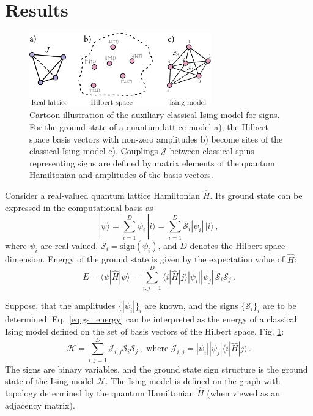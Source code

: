\section{Results}\label{sec:Ising}

\begin{figure}[t!]
    \centering
    \includegraphics[width=0.7\textwidth]{handmade/cartoon_ising.pdf}
	\caption{\label{fig:sign_ising}Cartoon illustration of the auxiliary classical Ising model for signs. For the ground state of a quantum lattice model a), the Hilbert space basis vectors with non-zero amplitudes b) become sites of the classical Ising model c). Couplings $\mathcal{J}$ between classical spins representing signs are defined by matrix elements of the quantum Hamiltonian and amplitudes of the basis vectors.}
\end{figure}

Consider a real-valued quantum lattice Hamiltonian $\hat{H}$.  Its ground state can be expressed in the computational basis as
\begin{equation}
|\psi \rangle = \sum\limits_{i=1}^D \psi_i \, |i\rangle = \sum\limits_{i=1}^D \mathcal{S}_i |\psi_i| \,| i \rangle \,,
\label{eq:quantum_gs}
\end{equation}
where $\psi_i$ are real-valued, $\mathcal{S}_i = \mathrm{sign}(\psi_i)$, and $D$ denotes the Hilbert space dimension. Energy of the ground state is given by the expectation value of $\hat{H}$:
\begin{equation}
    E = \langle \psi | \hat{H} | \psi \rangle = \sum\limits_{i,j = 1}^{D} \langle i | \hat{H} | j \rangle |\psi_i| |\psi_j| \, \mathcal{S}_i \mathcal{S}_j \,. \label{eq:gs_energy}
\end{equation}

Suppose, that the amplitudes $\{|\psi_i|\}_i$ are known, and the signs $\{\mathcal{S}_i\}_i$ are to be determined. Eq.~\eqref{eq:gs_energy} can be interpreted as the energy of a classical Ising model defined on the set of basis vectors of the Hilbert space, Fig. \ref{fig:sign_ising}:
\begin{equation}
    \mathcal{H} = \sum\limits_{i,j = 1}^D \mathcal{J}_{i,j} \mathcal{S}_i \mathcal{S}_j\,, \text{ where } \mathcal{J}_{i,j} = |\psi_i||\psi_j| \langle i | \hat{H} | j \rangle \,. \label{eq:Ising}
\end{equation}
The signs are binary variables, and the ground state sign structure is the ground state of the Ising model $\mathcal{H}$. The Ising model is defined on the graph with topology determined by the quantum Hamiltonian $\hat{H}$ (when viewed as an adjacency matrix).

